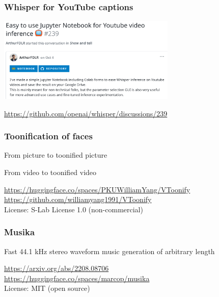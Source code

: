 \documentclass[17pt,aspectratio=169,hyperref={pdfusetitle,colorlinks,allcolors=olive}]{beamer}
\begin{document}
\begin{frame}[fragile]
  \frametitle{Whisper for YouTube captions}

  \includegraphics[width=8.5cm]{figs/whisper-youtube}

  \begin{flushright}
    {\scriptsize
    \url{https://github.com/openai/whisper/discussions/239}
  }
  \end{flushright}

\end{frame}


\begin{frame}[fragile]
  \frametitle{Toonification of faces}

  From picture to toonified picture

  From video to toonified video
  
  \begin{flushright}
    \url{https://huggingface.co/spaces/PKUWilliamYang/VToonify} \\
    \url{https://github.com/williamyang1991/VToonify} \\
    License: S-Lab License 1.0 (non-commercial) \\
  \end{flushright}

\end{frame}

\begin{frame}[fragile]
  \frametitle{Musika}

  Fast 44.1 kHz stereo waveform music generation of arbitrary length

  \begin{flushright}
    \url{https://arxiv.org/abs/2208.08706} \\
    \url{https://huggingface.co/spaces/marcop/musika} \\
    License: MIT (open source) \\
  \end{flushright}

\end{frame}
\end{document}
